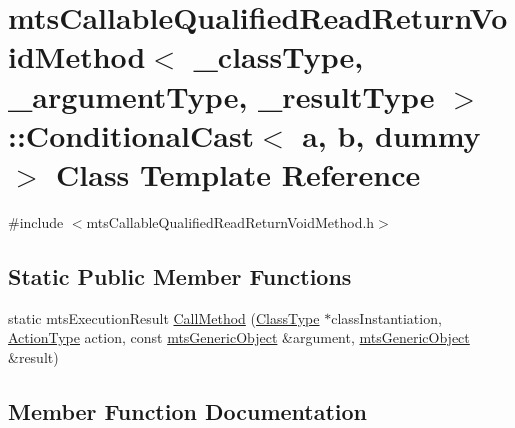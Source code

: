 \hypertarget{classmts_callable_qualified_read_return_void_method_1_1_conditional_cast}{}\section{mts\+Callable\+Qualified\+Read\+Return\+Void\+Method$<$ \+\_\+class\+Type, \+\_\+argument\+Type, \+\_\+result\+Type $>$\+:\+:Conditional\+Cast$<$ a, b, dummy $>$ Class Template Reference}
\label{classmts_callable_qualified_read_return_void_method_1_1_conditional_cast}


{\ttfamily \#include $<$mts\+Callable\+Qualified\+Read\+Return\+Void\+Method.\+h$>$}

\subsection*{Static Public Member Functions}
\begin{DoxyCompactItemize}
\item 
static mts\+Execution\+Result \hyperlink{classmts_callable_qualified_read_return_void_method_1_1_conditional_cast_ae109ca9f6c5605e6e09fd6c3b02f13e6}{Call\+Method} (\hyperlink{classmts_callable_qualified_read_return_void_method_ae99cfab8208eb374f2cdf01c97edfa3b}{Class\+Type} $\ast$class\+Instantiation, \hyperlink{classmts_callable_qualified_read_return_void_method_a90bf5eae1c7fdee0396313ce6de022bb}{Action\+Type} action, const \hyperlink{classmts_generic_object}{mts\+Generic\+Object} \&argument, \hyperlink{classmts_generic_object}{mts\+Generic\+Object} \&result)
\end{DoxyCompactItemize}


\subsection{Member Function Documentation}
\hypertarget{classmts_callable_qualified_read_return_void_method_1_1_conditional_cast_ae109ca9f6c5605e6e09fd6c3b02f13e6}{}
